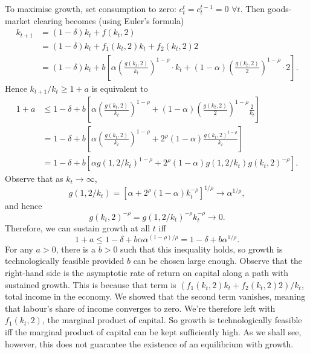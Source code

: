 \documentclass[11pt,letterpaper,reqno,oneside]{article}
\begin{document}
To maximise growth, set consumption to zero: $c^t_t = c^{t-1}_t = 0$ $\forall t$. Then goods-market clearing becomes (using Euler's formula)
%
\begin{align*}
	k_{t+1} 
	&= (1-\delta) k_t + f(k_t,2)
	\\
	&= (1-\delta) k_t + f_1(k_t,2) k_t + f_2(k_t,2) 2
	\\
	&= (1-\delta) k_t + b\left[ 
	\alpha \left(\frac{g(k_t,2)}{k_t}\right)^{1-\rho} \cdot k_t
	+ (1-\alpha) \left(\frac{g(k_t,2)}{2}\right)^{1-\rho} \cdot 2
	\right] .
\end{align*}
%
Hence $k_{t+1}/k_t \geq 1+a$ is equivalent to
%
\begin{align*}
	1+a
	&\leq
	1-\delta + b\left[ 
	\alpha \left(\frac{g(k_t,2)}{k_t}\right)^{1-\rho}
	+ (1-\alpha) \left(\frac{g(k_t,2)}{2}\right)^{1-\rho} \frac{2}{k_t}
	\right]
	\\
	&=
	1-\delta + b\left[ 
	\alpha \left(\frac{g(k_t,2)}{k_t}\right)^{1-\rho}
	+ 2^\rho (1-\alpha) \frac{g(k_t,2)^{1-\rho}}{k_t}
	\right]
	\\
	&=
	1-\delta + b\left[ 
	\alpha g(1,2/k_t)^{1-\rho}
	+ 2^\rho (1-\alpha) g(1,2/k_t) g(k_t,2)^{-\rho}
	\right] .
\end{align*}
%
Observe that as $k_t \to \infty$, 
%
\begin{equation*}
	g(1,2/k_t) 
	= \left[ \alpha + 2^\rho (1-\alpha) k_t^{-\rho} \right]^{1/\rho}
	\to \alpha^{1/\rho} ,
\end{equation*}
%
and hence
%
\begin{equation*}
	g(k_t,2)^{-\rho} 
	= g(1,2/k_t)^{-\rho} k_t^{-\rho} 
	\to 0 .
\end{equation*}
%
Therefore, we can sustain growth at all $t$ iff
%
\begin{equation*}
	1+a
	\leq
	1-\delta + b \alpha \alpha^{(1-\rho)/\rho}
	=
	1-\delta + b \alpha^{1/\rho} .
\end{equation*}
%
For any $a>0$, there is a $b>0$ such that this inequality holds, so growth is technologically feasible provided $b$ can be chosen large enough. Observe that the right-hand side is the asymptotic rate of return on capital along a path with sustained growth. This is because that term is $( f_1(k_t,2) k_t + f_2(k_t,2) 2 ) / k_t$, total income in the economy. We showed that the second term vanishes, meaning that labour's share of income converges to zero. We're therefore left with $f_1(k_t,2)$, the marginal product of capital. So growth is technologically feasible iff the marginal product of capital can be kept sufficiently high. As we shall see, however, this does not guarantee the existence of an equilibrium with growth.
\end{document}
